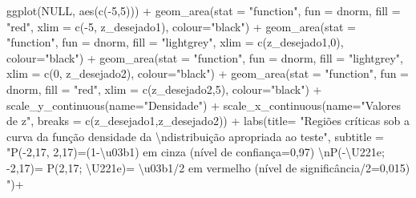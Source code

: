 \documentclass[
]{book}
\newenvironment{Shaded}{\begin{snugshade}}{\end{snugshade}}
\newcommand{\AttributeTok}[1]{\textcolor[rgb]{0.77,0.63,0.00}{#1}}
\newcommand{\ConstantTok}[1]{\textcolor[rgb]{0.00,0.00,0.00}{#1}}
\newcommand{\DecValTok}[1]{\textcolor[rgb]{0.00,0.00,0.81}{#1}}
\newcommand{\FunctionTok}[1]{\textcolor[rgb]{0.00,0.00,0.00}{#1}}
\newcommand{\NormalTok}[1]{#1}
\newcommand{\SpecialCharTok}[1]{\textcolor[rgb]{0.00,0.00,0.00}{#1}}
\newcommand{\StringTok}[1]{\textcolor[rgb]{0.31,0.60,0.02}{#1}}
\begin{document}
\begin{Shaded}
\begin{Highlighting}[]
\FunctionTok{ggplot}\NormalTok{(}\ConstantTok{NULL}\NormalTok{, }\FunctionTok{aes}\NormalTok{(}\FunctionTok{c}\NormalTok{(}\SpecialCharTok{{-}}\DecValTok{5}\NormalTok{,}\DecValTok{5}\NormalTok{))) }\SpecialCharTok{+}
  \FunctionTok{geom\_area}\NormalTok{(}\AttributeTok{stat =} \StringTok{"function"}\NormalTok{, }
            \AttributeTok{fun =}\NormalTok{ dnorm, }
            \AttributeTok{fill =} \StringTok{"red"}\NormalTok{, }
            \AttributeTok{xlim =} \FunctionTok{c}\NormalTok{(}\SpecialCharTok{{-}}\DecValTok{5}\NormalTok{, z\_desejado1),}
            \AttributeTok{colour=}\StringTok{"black"}\NormalTok{) }\SpecialCharTok{+}
  \FunctionTok{geom\_area}\NormalTok{(}\AttributeTok{stat =} \StringTok{"function"}\NormalTok{, }
            \AttributeTok{fun =}\NormalTok{ dnorm, }
            \AttributeTok{fill =} \StringTok{"lightgrey"}\NormalTok{, }
            \AttributeTok{xlim =} \FunctionTok{c}\NormalTok{(z\_desejado1,}\DecValTok{0}\NormalTok{),}
            \AttributeTok{colour=}\StringTok{"black"}\NormalTok{) }\SpecialCharTok{+}
  \FunctionTok{geom\_area}\NormalTok{(}\AttributeTok{stat =} \StringTok{"function"}\NormalTok{, }
            \AttributeTok{fun =}\NormalTok{ dnorm, }
            \AttributeTok{fill =} \StringTok{"lightgrey"}\NormalTok{, }
            \AttributeTok{xlim =} \FunctionTok{c}\NormalTok{(}\DecValTok{0}\NormalTok{, z\_desejado2),}
            \AttributeTok{colour=}\StringTok{"black"}\NormalTok{) }\SpecialCharTok{+}
  \FunctionTok{geom\_area}\NormalTok{(}\AttributeTok{stat =} \StringTok{"function"}\NormalTok{, }
            \AttributeTok{fun =}\NormalTok{ dnorm, }
            \AttributeTok{fill =} \StringTok{"red"}\NormalTok{, }
            \AttributeTok{xlim =} \FunctionTok{c}\NormalTok{(z\_desejado2,}\DecValTok{5}\NormalTok{),}
            \AttributeTok{colour=}\StringTok{"black"}\NormalTok{) }\SpecialCharTok{+}
  \FunctionTok{scale\_y\_continuous}\NormalTok{(}\AttributeTok{name=}\StringTok{"Densidade"}\NormalTok{) }\SpecialCharTok{+}
  \FunctionTok{scale\_x\_continuous}\NormalTok{(}\AttributeTok{name=}\StringTok{"Valores de z"}\NormalTok{, }\AttributeTok{breaks =} \FunctionTok{c}\NormalTok{(z\_desejado1,z\_desejado2))  }\SpecialCharTok{+}
  \FunctionTok{labs}\NormalTok{(}\AttributeTok{title=} 
         \StringTok{"Regiões críticas sob a curva da função densidade da }\SpecialCharTok{\textbackslash{}n}\StringTok{distribuição apropriada ao teste"}\NormalTok{, }
       \AttributeTok{subtitle =} \StringTok{"P({-}2,17, 2,17)=(1{-}\textbackslash{}u03b1) em cinza (nível de confiança=0,97) }\SpecialCharTok{\textbackslash{}n}\StringTok{P({-}\textbackslash{}U221e; {-}2,17)= P(2,17; \textbackslash{}U221e)= \textbackslash{}u03b1/2 em vermelho (nível de significância/2=0,015) "}\NormalTok{)}\SpecialCharTok{+}

\end{Highlighting}
\end{Shaded}
\end{document}
